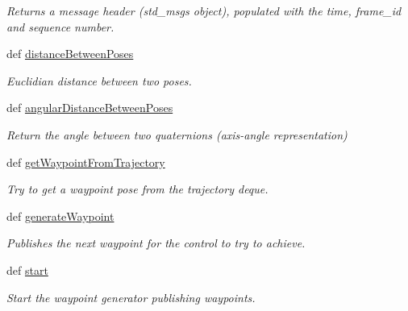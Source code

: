 \begin{DoxyCompactItemize}
\begin{DoxyCompactList}\small\item\em \-Returns a message header (std\-\_\-msgs object), populated with the time, frame\-\_\-id and sequence number. \end{DoxyCompactList}\item 
def \hyperlink{classhrl__haptic__mpc_1_1waypoint__generator_1_1_waypoint_generator_a65cbfbbbbfc447f2ff015345b9d8112c}{distance\-Between\-Poses}
\begin{DoxyCompactList}\small\item\em \-Euclidian distance between two poses. \end{DoxyCompactList}\item 
def \hyperlink{classhrl__haptic__mpc_1_1waypoint__generator_1_1_waypoint_generator_ad22a1797ec94a6b3da152fc0f001543c}{angular\-Distance\-Between\-Poses}
\begin{DoxyCompactList}\small\item\em \-Return the angle between two quaternions (axis-\/angle representation) \end{DoxyCompactList}\item 
def \hyperlink{classhrl__haptic__mpc_1_1waypoint__generator_1_1_waypoint_generator_ab53dd0dc8187fe26b38143ef90494d23}{get\-Waypoint\-From\-Trajectory}
\begin{DoxyCompactList}\small\item\em \-Try to get a waypoint pose from the trajectory deque. \end{DoxyCompactList}\item 
def \hyperlink{classhrl__haptic__mpc_1_1waypoint__generator_1_1_waypoint_generator_ae3ad18aaf5a48be5903d9b8e83315916}{generate\-Waypoint}
\begin{DoxyCompactList}\small\item\em \-Publishes the next waypoint for the control to try to achieve. \end{DoxyCompactList}\item 
def \hyperlink{classhrl__haptic__mpc_1_1waypoint__generator_1_1_waypoint_generator_a483d2236e4740f32aff0b5fa9202a944}{start}
\begin{DoxyCompactList}\small\item\em \-Start the waypoint generator publishing waypoints. \end{DoxyCompactList}\end{DoxyCompactItemize}
